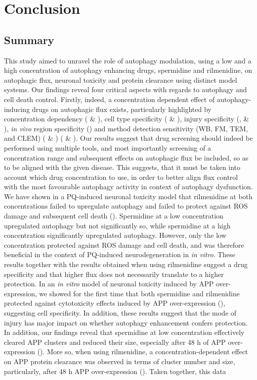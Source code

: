 \chapter{Conclusion}
\section{Summary}
This study aimed to unravel the role of autophagy modulation, using a low and a high concentration of autophagy enhancing drugs, spermidine and rilmenidine, on autophagic flux, neuronal toxicity and protein clearance using distinct model systems. Our findings reveal four critical aspects with regards to autophagy and cell death control. Firstly, indeed, a concentration dependent effect of autophagy-inducing drugs on autophagic flux exists, particularly highlighted by concentration dependency ( \& ), cell type specificity ( \& ), injury specificity (,  \& ), \textit{in vivo} region specificity () and method detection sensitivity (WB, FM, TEM, and CLEM) ( \& ) ( \& ). Our results suggest that drug screening should indeed be performed using multiple tools, and most importantly screening of a concentration range and subsequent effects on autophagic flux be included, so as to be aligned with the given disease. This suggests, that it must be taken into account which drug concentration to use, in order to better align flux control with the most favourable autophagy activity in context of autophagy dysfunction. We have shown in a PQ-induced neuronal toxicity model that rilmenidine at both concentrations failed to upregulate autophagy and failed to protect against ROS damage and subsequent cell death (). Spermidine at a low concentration upregulated autophagy but not significantly so, while spermidine at a high concentration significantly upregulated autophagy. However, only the low concentration protected against ROS damage and cell death, and was therefore beneficial in the context of PQ-induced neurodegeneration in \textit{in vitro}. These results together with the results obtained when using rilmenidine suggest a drug specificity and that higher flux does not necessarily translate to a higher protection. In an \textit{in vitro} model of neuronal toxicity induced by APP over-expression, we showed for the first time that both spermidine and rilmenidine protected against cytotoxicity effects induced by APP over-expression (), suggesting cell specificity. In addition, these results suggest that the mode of injury has major impact on whether autophagy enhancement  confers protection. In addition, our findings reveal that spermidine at low concentration effectively cleared APP clusters and reduced their size, especially after 48 h of APP over-expression (). More so, when using rilmenidine, a concentration-dependent effect on APP protein clearance was observed in terms of  cluster number and size, particularly, after 48 h APP over-expression (). Taken together, this data 